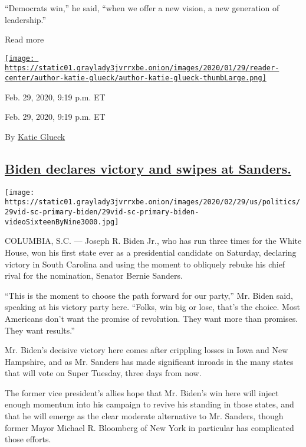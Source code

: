 ``Democrats win,'' he said, ``when we offer a new vision, a new
generation of leadership.''

Read more

\href{https://www.nytimes3xbfgragh.onion/by/katie-glueck}{\texttt{[image: https://static01.graylady3jvrrxbe.onion/images/2020/01/29/reader-center/author-katie-glueck/author-katie-glueck-thumbLarge.png]}}

Feb. 29, 2020, 9:19 p.m. ET

Feb. 29, 2020, 9:19 p.m. ET

By \href{https://www.nytimes3xbfgragh.onion/by/katie-glueck}{Katie
Glueck}

\hypertarget{biden-declares-victory-and-swipes-at-sanders}{%
\subsection{\texorpdfstring{\protect\hyperlink{biden-declares-victory-and-swipes-at-sanders}{Biden
declares victory and swipes at
Sanders.}}{Biden declares victory and swipes at Sanders.}}\label{biden-declares-victory-and-swipes-at-sanders}}

\texttt{[image: https://static01.graylady3jvrrxbe.onion/images/2020/02/29/us/politics/29vid-sc-primary-biden/29vid-sc-primary-biden-videoSixteenByNine3000.jpg]}

COLUMBIA, S.C. --- Joseph R. Biden Jr., who has run three times for the
White House, won his first state ever as a presidential candidate on
Saturday, declaring victory in South Carolina and using the moment to
obliquely rebuke his chief rival for the nomination, Senator Bernie
Sanders.

``This is the moment to choose the path forward for our party,'' Mr.
Biden said, speaking at his victory party here. ``Folks, win big or
lose, that's the choice. Most Americans don't want the promise of
revolution. They want more than promises. They want results.''

Mr. Biden's decisive victory here comes after crippling losses in Iowa
and New Hampshire, and as Mr. Sanders has made significant inroads in
the many states that will vote on Super Tuesday, three days from now.

The former vice president's allies hope that Mr. Biden's win here will
inject enough momentum into his campaign to revive his standing in those
states, and that he will emerge as the clear moderate alternative to Mr.
Sanders, though former Mayor Michael R. Bloomberg of New York in
particular has complicated those efforts.

